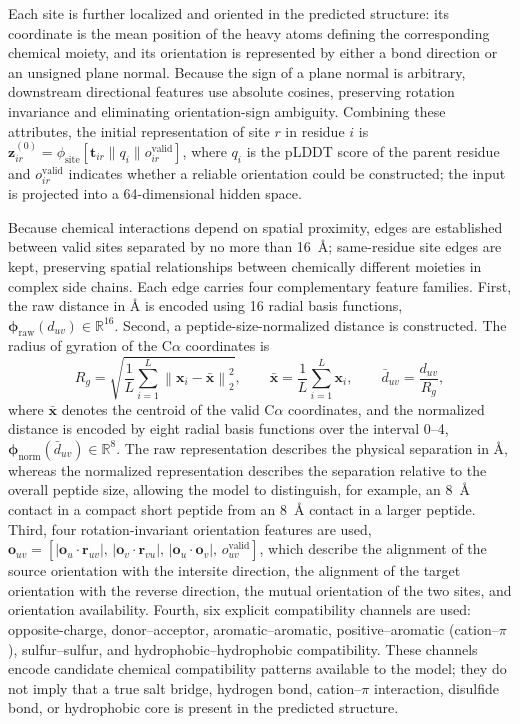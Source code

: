 \documentclass[12pt]{article}
\begin{document}
Each site is further localized and oriented in the predicted structure: its
coordinate is the mean position of the heavy atoms defining the corresponding
chemical moiety, and its orientation is represented by either a bond
direction or an unsigned plane normal. Because the sign of a plane normal is
arbitrary, downstream directional features use absolute cosines, preserving
rotation invariance and eliminating orientation-sign ambiguity. Combining
these attributes, the initial representation of site $r$ in residue $i$ is
$\mathbf z_{ir}^{(0)} = \phi_{\mathrm{site}}[\mathbf t_{ir} \parallel q_i
\parallel o_{ir}^{\mathrm{valid}}]$, where $q_i$ is the pLDDT score of the
parent residue and $o_{ir}^{\mathrm{valid}}$ indicates whether a reliable
orientation could be constructed; the input is projected into a 64-dimensional
hidden space.

Because chemical interactions depend on spatial proximity, edges are
established between valid sites separated by no more than 16~\AA{}; same-residue
site edges are kept, preserving spatial relationships between chemically
different moieties in complex side chains. Each edge carries four
complementary feature families. First, the raw distance in \AA{} is encoded using
16 radial basis functions, $\boldsymbol\phi_{\mathrm{raw}}(d_{uv}) \in
\mathbb{R}^{16}$. Second, a peptide-size-normalized distance is constructed.
The radius of gyration of the C$\alpha$ coordinates is
\begin{equation}
    R_g = \sqrt{\frac{1}{L} \sum_{i=1}^{L}
    \left\lVert \mathbf x_i - \bar{\mathbf x} \right\rVert_2^2},
    \qquad \bar{\mathbf x} = \frac{1}{L} \sum_{i=1}^{L} \mathbf x_i,
    \qquad \bar{d}_{uv} = \frac{d_{uv}}{R_g},
    \label{eq:normalized_distance}
\end{equation}
where $\bar{\mathbf x}$ denotes the centroid of the valid C$\alpha$
coordinates, and the normalized distance is encoded by eight radial basis
functions over the interval 0--4, $\boldsymbol\phi_{\mathrm{norm}}(\bar{d}_{uv})
\in \mathbb{R}^{8}$. The raw representation describes the physical separation
in \AA{}, whereas the normalized representation describes the separation relative
to the overall peptide size, allowing the model to distinguish, for example,
an 8~\AA{} contact in a compact short peptide from an 8~\AA{} contact in a larger
peptide. Third, four rotation-invariant orientation features are used,
$\mathbf o_{uv} = [|\mathbf o_u \cdot \mathbf r_{uv}|,\,
|\mathbf o_v \cdot \mathbf r_{vu}|,\, |\mathbf o_u \cdot \mathbf o_v|,\,
o_{uv}^{\mathrm{valid}}]$, which describe the alignment of the source
orientation with the intersite direction, the alignment of the target
orientation with the reverse direction, the mutual orientation of the two
sites, and orientation availability. Fourth, six explicit compatibility
channels are used: opposite-charge, donor--acceptor, aromatic--aromatic,
positive--aromatic (cation--$\pi$), sulfur--sulfur, and
hydrophobic--hydrophobic compatibility. These channels encode candidate
chemical compatibility patterns available to the model; they do not imply
that a true salt bridge, hydrogen bond, cation--$\pi$ interaction, disulfide
bond, or hydrophobic core is present in the predicted structure.
\end{document}
